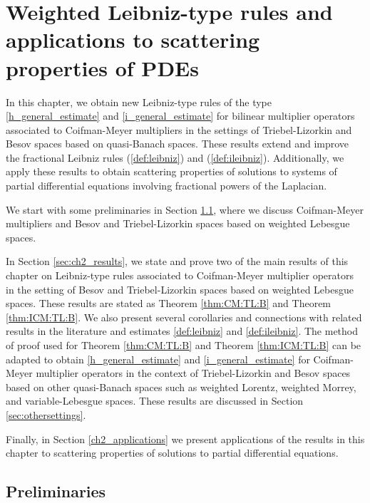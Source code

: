 \cleardoublepage

\chapter{Weighted Leibniz-type rules and applications to scattering properties of PDEs}\label{chapter2}


In this chapter, we obtain new Leibniz-type rules of the type \eqref{h_general_estimate} and \eqref{i_general_estimate} for bilinear multiplier operators associated to Coifman-Meyer multipliers in the settings of Triebel-Lizorkin and Besov spaces based on quasi-Banach spaces. These results extend and improve the fractional Leibniz rules (\ref{def:leibniz}) and (\ref{def:ileibniz}).  Additionally, we apply these results to obtain scattering properties of solutions to systems of partial differential equations involving fractional powers of the Laplacian. 

We start with some preliminaries in Section \ref{ch2_prelim}, where we discuss Coifman-Meyer multipliers and Besov and Triebel-Lizorkin spaces based on weighted Lebesgue spaces.

In Section \ref{sec:ch2_results}, we state and prove two of the main results of this chapter on Leibniz-type rules associated to Coifman-Meyer multiplier operators in the setting of Besov and Triebel-Lizorkin spaces based on weighted Lebesgue spaces. These results are stated as Theorem \ref{thm:CM:TL:B} and Theorem \ref{thm:ICM:TL:B}. We also present several corollaries and connections with related results in the literature and estimates \eqref{def:leibniz} and \eqref{def:ileibniz}. The method of proof used for Theorem \ref{thm:CM:TL:B} and Theorem \ref{thm:ICM:TL:B} can be adapted to obtain \eqref{h_general_estimate} and \eqref{i_general_estimate} for Coifman-Meyer multiplier operators in the context of Triebel-Lizorkin and Besov spaces based on other quasi-Banach spaces such as weighted Lorentz, weighted Morrey, and variable-Lebesgue spaces. These results are discussed in Section \ref{sec:othersettings}.

Finally, in Section \ref{ch2_applications} we present applications of the results in this chapter to scattering properties of solutions to partial differential equations. 

\section{Preliminaries}\label{ch2_prelim}

